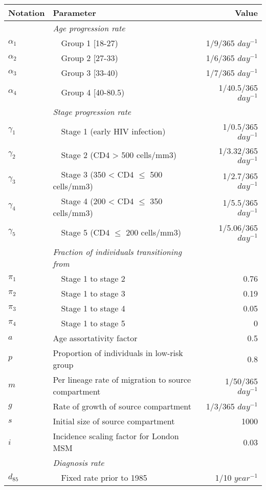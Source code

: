 	\begin{threeparttable}						
	\begin{tabular}{llr} %
	\toprule						
	Notation		&	Parameter	&	Value	\\
	\midrule						
			&	\emph{Age progression rate} \tnote{a}	&		\\
$	\alpha_1	$	&	~~Group 1 [18-27)	&	1/9/365 $day^{-1}$	\\
$	\alpha_2	$	&	~~Group 2 [27-33)	&	1/6/365 $day^{-1}$	\\
$	\alpha_3	$	&	~~Group 3 [33-40)	&	1/7/365 $day^{-1}$	\\
$	\alpha_4	$	&	~~Group 4 [40-80.5)	&	1/40.5/365 $day^{-1}$	\\
			&	\emph{Stage progression rate}\tnote{b}	&		\\
$	\gamma_1	$	&	~~Stage 1 (early HIV infection) 	&	1/0.5/365 $day^{-1}$	\\
$	\gamma_2	$	&	~~Stage 2 (CD4 > 500 cells/mm3)	&	1/3.32/365 $day^{-1}$	\\
$	\gamma_3	$	&	~~Stage 3 (350 < CD4 $\leq$ 500 cells/mm3)	&	1/2.7/365 $day^{-1}$	\\
$	\gamma_4	$	&	~~Stage 4 (200 < CD4 $\le$ 350 cells/mm3)	&	1/5.5/365 $day^{-1}$	\\
$	\gamma_5	$	&	~~Stage 5 (CD4 $\leq$ 200 cells/mm3)	&	1/5.06/365 $day^{-1}$	\\
			&	\emph{Fraction of individuals transitioning from} \tnote{b}	&		\\
$	\pi_1	$	&	~~Stage 1 to stage 2 	&	0.76	\\
$	\pi_2	$	&	~~Stage 1 to stage 3	&	0.19	\\
$	\pi_3	$	&	~~Stage 1 to stage 4	&	0.05	\\
$	\pi_4	$	&	~~Stage 1 to stage 5	&	0	\\
$	a	$	&	Age assortativity factor	&	0.5	\\
$	p	$	&	Proportion of individuals in low-risk group	&	0.8	\\
$	m	$	&	Per lineage rate of migration to source compartment	&	1/50/365 $day^{-1}$	\\
$	g	$	&	Rate of growth of source compartment	&	1/3/365 $day^{-1}$	\\
$	s	$	&	Initial size of source compartment	&	1000	\\
$	i	$	&	Incidence scaling factor for London MSM \tnote{c}	&	0.03	\\
			&	\emph{Diagnosis rate}	&		\\
$	d_{85}	$	&	~~Fixed rate prior to 1985	&	1/10 $year^{-1}$	\\

\end{tabular}
\end{threeparttable}
